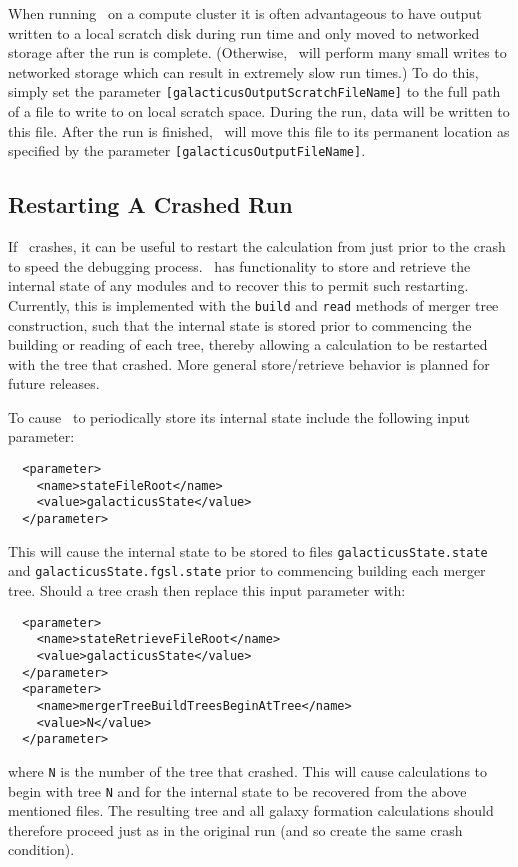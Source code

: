 When running \glc\ on a compute cluster it is often advantageous to have output written to a local scratch disk during run time and only moved to networked storage after the run is complete. (Otherwise, \glc\ will perform many small writes to networked storage which can result in extremely slow run times.) To do this, simply set the parameter {\tt [galacticusOutputScratchFileName]} to the full path of a file to write to on local scratch space. During the run, data will be written to this file. After the run is finished, \glc\ will move this file to its permanent location as specified by the parameter {\tt [galacticusOutputFileName]}.

\subsection{Restarting A Crashed Run}\label{sec:Restarting}

If \glc\ crashes, it can be useful to restart the calculation from just prior to the crash to speed the debugging process. \glc\ has functionality to store and retrieve the internal state of any modules and to recover this to permit such restarting. Currently, this is implemented with the {\tt build} and {\tt read} methods of merger tree construction, such that the internal state is stored prior to commencing the building or reading of each tree, thereby allowing a calculation to be restarted with the tree that crashed. More general store/retrieve behavior is planned for future releases.

To cause \glc\ to periodically store its internal state include the following input parameter:
\begin{verbatim}
  <parameter>
    <name>stateFileRoot</name>
    <value>galacticusState</value>
  </parameter>
\end{verbatim}
This will cause the internal state to be stored to files {\tt galacticusState.state} and {\tt galacticusState.fgsl.state} prior to commencing building each merger tree. Should a tree crash then replace this input parameter with:
\begin{verbatim}
  <parameter>
    <name>stateRetrieveFileRoot</name>
    <value>galacticusState</value>
  </parameter>
  <parameter>
    <name>mergerTreeBuildTreesBeginAtTree</name>
    <value>N</value>
  </parameter>
\end{verbatim}
where {\tt N} is the number of the tree that crashed. This will cause calculations to begin with tree {\tt N} and for the internal state to be recovered from the above mentioned files. The resulting tree and all galaxy formation calculations should therefore proceed just as in the original run (and so create the same crash condition).

